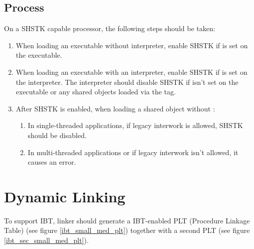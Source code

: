 \subsection{Process }
\label{shstk}

On a SHSTK capable processor, the following steps should be taken:

\begin{enumerate}
  \item
    \begin{sloppypar}
      When loading an executable without interpreter, enable SHSTK if
       is set on the executable.
    \end{sloppypar}
  \item
    \begin{sloppypar}
      When loading an executable with an interpreter, enable SHSTK if
       is set on the interpreter.
      The interpreter should disable SHSTK if
       isn't set on the executable
      or any shared objects loaded via the  tag.
    \end{sloppypar}
  \item
    \begin{sloppypar}
      After SHSTK is enabled, when loading a shared object without
      :
    \end{sloppypar}
    \begin{enumerate}
      \item In single-threaded applications, if legacy interwork is
      allowed, SHSTK should be disabled.
      \item In multi-threaded applications or if legacy interwork isn't
      allowed, it causes an error.
    \end{enumerate}
\end{enumerate}

\section{Dynamic Linking}

To support IBT, linker should generate a IBT-enabled PLT (Procedure
Linkage Table) (see figure \ref{ibt_small_med_plt}) together with a second
PLT (see figure \ref{ibt_sec_small_med_plt}).

